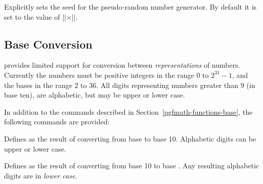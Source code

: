 \begin{command}{\pgfmathsetseed{}}
  Explicitly sets the seed for the pseudo-random number generator. By
  default it is set to the value of |\time|$\times$|\year|.
\end{command}


      
\subsection{Base Conversion}
	
\label{pgfmath-bases}

\pgfname{} provides limited support for conversion between 
\emph{representations} of numbers. Currently the numbers must be
positive integers in the range $0$ to $2^{31}-1$, and the bases in the
range $2$ to $36$. All digits representing numbers greater than 9 (in
base ten), are alphabetic, but may be upper or lower case. 

In addition to the commands described in 
Section~\ref{pgfmath-functions-base}, 
the following commands are provided:

\begin{command}{\pgfmathbasetodec{}}
	Defines  as the result of converting  from
	base  to base 10. Alphabetic digits can be upper or lower
	case.

\medskip

\end{command}

\begin{command}{\pgfmathdectobase{}}
	Defines  as the result of converting  from
	base 10 to base . Any resulting alphabetic digits are in
	\emph{lower case}.
	
\begin{codeexample}[]
\pgfmathdectobase{} \mynumber
\end{codeexample}

\end{command}

